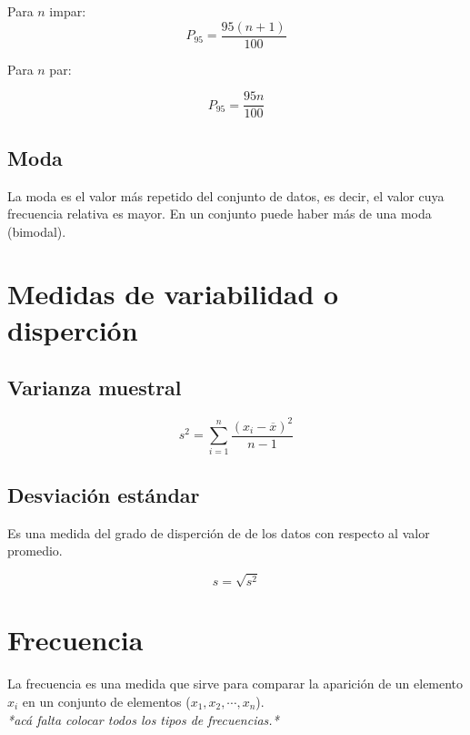 \documentclass{report}
\begin{document}
            \indent Para $n$ impar:
            \begin{equation*}
              P_95=\frac{95(n+1)}{100}
            \end{equation*}

            Para $n$ par:

            \begin{equation*}
              P_95=\frac{95n}{100}
            \end{equation*}

      \subsection*{Moda}
        La moda es el valor más repetido del conjunto de datos, es decir, el valor 
        cuya frecuencia relativa es mayor. En un conjunto puede haber más de una 
        moda (bimodal).

    \section*{Medidas de variabilidad o disperción}
      
      \subsection*{Varianza muestral}
        
        \begin{equation*}
          s^2=\sum_{i=1}^n\frac{(x_i-\overline{x})^2}{n-1}
        \end{equation*}

      \subsection*{Desviación estándar}
        Es una medida del grado de disperción de de los datos con respecto al
        valor promedio.

        \begin{equation*}
          s=\sqrt{s^2}
        \end{equation*}

    \section*{Frecuencia}
      La frecuencia es una medida que sirve para comparar la aparición de un 
      elemento $x_i$ en un conjunto de elementos ($x_1, x_2, \dotsm, x_n$).\\
      \indent\textit{*acá falta colocar todos los tipos de frecuencias.*}
\end{document}
